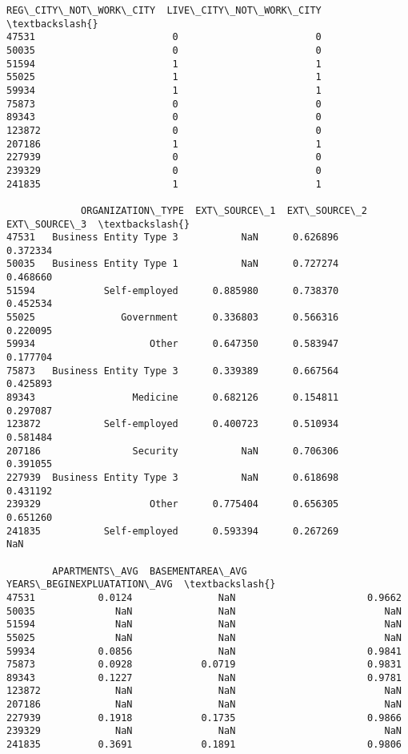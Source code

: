 \documentclass[11pt]{article}
\begin{document}
\begin{tcolorbox}[breakable, size=fbox, boxrule=.5pt, pad at break*=1mm, opacityfill=0]
\begin{Verbatim}[commandchars=\\\{\}]
        REG\_CITY\_NOT\_WORK\_CITY  LIVE\_CITY\_NOT\_WORK\_CITY  \textbackslash{}
47531                        0                        0
50035                        0                        0
51594                        1                        1
55025                        1                        1
59934                        1                        1
75873                        0                        0
89343                        0                        0
123872                       0                        0
207186                       1                        1
227939                       0                        0
239329                       0                        0
241835                       1                        1

             ORGANIZATION\_TYPE  EXT\_SOURCE\_1  EXT\_SOURCE\_2  EXT\_SOURCE\_3  \textbackslash{}
47531   Business Entity Type 3           NaN      0.626896      0.372334
50035   Business Entity Type 1           NaN      0.727274      0.468660
51594            Self-employed      0.885980      0.738370      0.452534
55025               Government      0.336803      0.566316      0.220095
59934                    Other      0.647350      0.583947      0.177704
75873   Business Entity Type 3      0.339389      0.667564      0.425893
89343                 Medicine      0.682126      0.154811      0.297087
123872           Self-employed      0.400723      0.510934      0.581484
207186                Security           NaN      0.706306      0.391055
227939  Business Entity Type 3           NaN      0.618698      0.431192
239329                   Other      0.775404      0.656305      0.651260
241835           Self-employed      0.593394      0.267269           NaN

        APARTMENTS\_AVG  BASEMENTAREA\_AVG  YEARS\_BEGINEXPLUATATION\_AVG  \textbackslash{}
47531           0.0124               NaN                       0.9662
50035              NaN               NaN                          NaN
51594              NaN               NaN                          NaN
55025              NaN               NaN                          NaN
59934           0.0856               NaN                       0.9841
75873           0.0928            0.0719                       0.9831
89343           0.1227               NaN                       0.9781
123872             NaN               NaN                          NaN
207186             NaN               NaN                          NaN
227939          0.1918            0.1735                       0.9866
239329             NaN               NaN                          NaN
241835          0.3691            0.1891                       0.9806


\end{Verbatim}
\end{tcolorbox}
\end{document}
